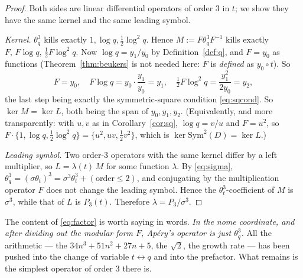 \documentclass[11pt,reqno]{amsart}
\theoremstyle{plain}
\theoremstyle{definition}
\theoremstyle{remark}
\newcommand{\ta}{\theta_t}
\newcommand{\tq}{\theta_q}
\numberwithin{equation}{section}
\begin{document}
\begin{proof}
Both sides are linear differential operators of order $3$ in $t$; we show they
have the same kernel and the same leading symbol.

\emph{Kernel.} $\tq^3$ kills exactly $1,\log q,\tfrac12\log^2q$. Hence
$M:=F\tq^3F^{-1}$ kills exactly $F,\,F\log q,\,\tfrac12F\log^2q$. Now
$\log q=y_1/y_0$ by Definition~\ref{def:q}, and $F=y_0$ as functions
(Theorem~\ref{thm:beukers} is not needed here: $F$ is \emph{defined} as
$y_0\circ t$). So
\[
  F=y_0,\quad F\log q=y_0\cdot\frac{y_1}{y_0}=y_1,\quad
  \tfrac12F\log^2q=\frac{y_1^2}{2y_0}=y_2,
\]
the last step being exactly the symmetric-square condition \eqref{eq:sqcond}.
So $\ker M=\ker L$, both being the span of $y_0,y_1,y_2$. (Equivalently, and
more transparently: with $u,v$ as in Corollary~\ref{cor:sq}, $\log q=v/u$ and
$F=u^2$, so $F\cdot\{1,\log q,\tfrac12\log^2q\}=\{u^2,uv,\tfrac12v^2\}$, which
is $\ker\mathrm{Sym}^2(D)=\ker L$.)

\emph{Leading symbol.} Two order-$3$ operators with the same kernel differ by a
left multiplier, so $L=\lambda(t)\,M$ for some function $\lambda$. By
\eqref{eq:sigma}, $\tq^3=(\sigma\ta)^3=\sigma^3\ta^3+(\text{order}\le2)$, and
conjugating by the multiplication operator $F$ does not change the leading
symbol. Hence the $\ta^3$-coefficient of $M$ is $\sigma^3$, while that of $L$
is $P_3(t)$. Therefore $\lambda=P_3/\sigma^3$.
\end{proof}

The content of \eqref{eq:factor} is worth saying in words. \emph{In the nome
coordinate, and after dividing out the modular form $F$, Ap\'ery's operator is
just $\tq^3$.} All the arithmetic --- the $34n^3+51n^2+27n+5$, the $\sqrt2$,
the growth rate --- has been pushed into the change of variable $t\leftrightarrow
q$ and into the prefactor. What remains is the simplest operator of order $3$
there is.
\end{document}
